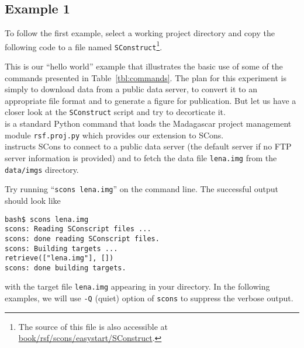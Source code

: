 \subsection{Example 1}

To follow the first example, select a working project directory and
copy the following code
to a file named \texttt{SConstruct}\footnote{The source of this file is also accessible at \href{http://svn.sourceforge.net/viewvc/rsf/trunk/book/rsf/scons/easystart/SConstruct?view=markup}{book/rsf/scons/easystart/SConstruct}.}.

%


This is our ``hello  world'' example that illustrates the basic use of
some of the commands presented in Table~\ref{tbl:commands}. The plan
for this experiment is simply to download data from a public data
server, to convert it to an appropriate file format and to generate a
figure for publication. But let us have a closer look at the
\texttt{SConstruct} script and try to decorticate it.\\


%
is a standard Python command that loads the Madagascar project
management module \texttt{rsf.proj.py} which provides our extension to
SCons.\\


%
instructs SCons to connect to a public data server (the default server
if no FTP server information is provided) and to fetch the data file
\texttt{lena.img} from the \texttt{data/imgs} directory. 
\begin{comment}
Note that
Madagascar expects a \texttt{data} folder on top of the specified
directory (i.e.  \texttt{imgs}). In the directory where you have your
SConstruct, running \texttt{scons lena.img} on the command line will
download the file \texttt{lena.img}.  The equivalent command lines are
\footnote{use login: anonymous, password: anonymous}
\begin{verbatim}
bash$ ftp egl.beg.utexas.edu
ftp> bin
ftp> cd data/imgs
ftp> get lena.img
ftp> bye
\end{verbatim}
\end{comment}
%
Try running ``\texttt{scons lena.img}'' on the command line. The successful output should look like
\begin{verbatim}
bash$ scons lena.img
scons: Reading SConscript files ...
scons: done reading SConscript files.
scons: Building targets ...
retrieve(["lena.img"], [])
scons: done building targets.
\end{verbatim}
with the target file \texttt{lena.img} appearing in your directory.
In the following examples, we will use \texttt{-Q} (quiet) option of
\texttt{scons} to suppress the verbose output.

